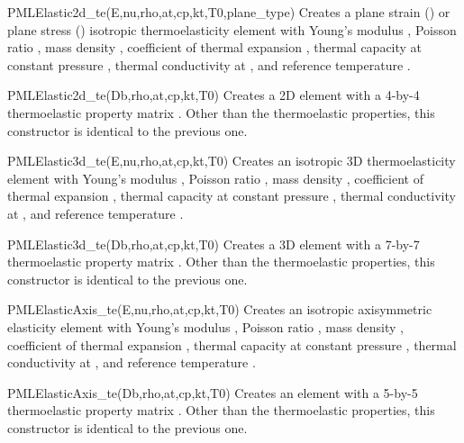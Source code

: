 \begin{codelist}
  \item[PMLElastic2d\_te(E,nu,rho,at,cp,kt,T0,plane\_type)]
    Creates a plane strain () or plane stress
    () isotropic thermoelasticity element with
    Young's modulus , Poisson ratio , mass
    density , coefficient of thermal expansion ,
    thermal capacity at constant pressure , thermal conductivity
    at , and reference temperature .

  \item[PMLElastic2d\_te(Db,rho,at,cp,kt,T0)]
    Creates a 2D element with a 4-by-4 thermoelastic property matrix
    .  Other than the thermoelastic properties, this constructor
    is identical to the previous one.

  \item[PMLElastic3d\_te(E,nu,rho,at,cp,kt,T0)]
    Creates an isotropic 3D thermoelasticity element with Young's modulus
    , Poisson ratio , mass density ,
    coefficient of thermal expansion ,
    thermal capacity at constant pressure , thermal conductivity
    at , and reference temperature .

  \item[PMLElastic3d\_te(Db,rho,at,cp,kt,T0)]
    Creates a 3D element with a 7-by-7 thermoelastic property matrix
    .  Other than the thermoelastic properties, this constructor
    is identical to the previous one.

  \item[PMLElasticAxis\_te(E,nu,rho,at,cp,kt,T0)]
    Creates an isotropic axisymmetric elasticity element with
    Young's modulus , Poisson ratio , mass density ,
    coefficient of thermal expansion ,
    thermal capacity at constant pressure , thermal conductivity
    at , and reference temperature .

  \item[PMLElasticAxis\_te(Db,rho,at,cp,kt,T0)]
    Creates an element with a 5-by-5 thermoelastic property matrix
    .  Other than the thermoelastic properties, this constructor
    is identical to the previous one.
\end{codelist}

\clearpage
